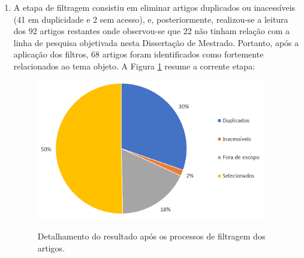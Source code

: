 \begin{enumerate}
    \item A etapa de filtragem consistiu em eliminar artigos duplicados ou inacessíveis (41 em duplicidade e 2 sem acesso), e, posteriormente, realizou-se a leitura dos 92 artigos restantes onde observou-se que 22 não tinham relação com a linha de pesquisa objetivada nesta Dissertação de Mestrado. Portanto, após a aplicação dos filtros, 68 artigos foram identificados como fortemente relacionados ao tema objeto. A Figura \ref{fig:grafico_processamento_papers} resume a corrente etapa:
    
    
    \begin{figure}[H]
    \centering
    \caption{Detalhamento do resultado após os processos de filtragem dos artigos.} \includegraphics[width=10cm,height=\textwidth,keepaspectratio]{figs/grafico_processamento_papers.png}
    \newline {}\label{fig:grafico_processamento_papers}
    \end{figure}    
    

\end{enumerate}
